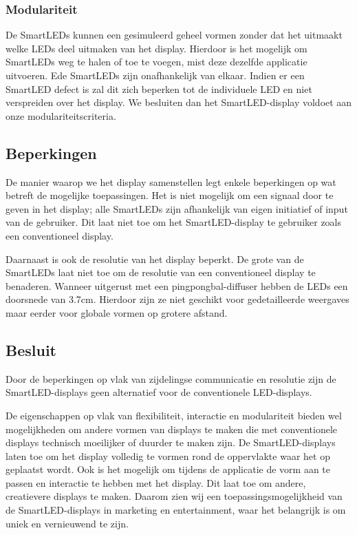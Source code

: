 \documentclass{article}
\begin{document}
\subsubsection{Modulariteit}

De SmartLEDs kunnen een gesimuleerd geheel vormen zonder dat het uitmaakt welke LEDs deel uitmaken van het display. Hierdoor is het mogelijk om SmartLEDs weg te halen of toe te voegen, mist deze dezelfde applicatie uitvoeren. Ede SmartLEDs zijn onafhankelijk van elkaar. Indien er een SmartLED defect is zal dit zich beperken tot de individuele LED en niet verspreiden over het display. We besluiten dan het SmartLED-display voldoet aan onze modulariteitscriteria.

\subsection{Beperkingen}
De manier waarop we het display samenstellen legt enkele beperkingen op wat betreft de mogelijke toepassingen. Het is niet mogelijk om een signaal door te geven in het display; alle SmartLEDs zijn afhankelijk van eigen initiatief of input van de gebruiker. Dit laat niet toe om het SmartLED-display te gebruiker zoals een conventioneel display. 

Daarnaast is ook de resolutie van het display beperkt. De grote van de SmartLEDs laat niet toe om de resolutie van een conventioneel display te benaderen. Wanneer uitgerust met een pingpongbal-diffuser hebben de LEDs een doorsnede van 3.7cm. Hierdoor zijn ze niet geschikt voor gedetailleerde weergaves maar eerder voor globale vormen op grotere afstand.

\subsection{Besluit}

Door de beperkingen op vlak van zijdelingse communicatie en resolutie zijn de SmartLED-displays geen alternatief voor de conventionele LED-displays. 

De eigenschappen op vlak van flexibiliteit, interactie en modulariteit bieden wel mogelijkheden om andere vormen van displays te maken die met conventionele displays technisch moeilijker of duurder te maken zijn. De SmartLED-displays laten toe om het display volledig te vormen rond de oppervlakte waar het op geplaatst wordt. Ook is het mogelijk om tijdens de applicatie de vorm aan te passen en interactie te hebben met het display. Dit laat toe om andere, creatievere displays te maken. Daarom zien wij een toepassingsmogelijkheid van de SmartLED-displays in marketing en entertainment, waar het belangrijk is om uniek en vernieuwend te zijn.
\end{document}
